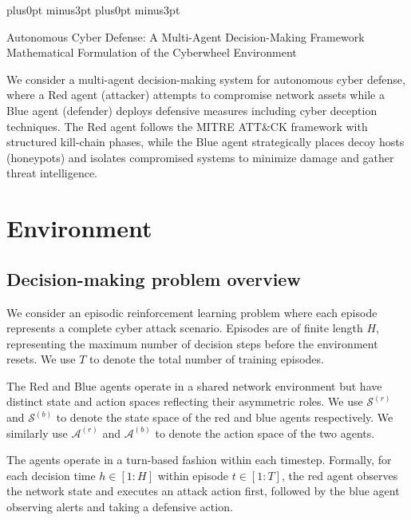 \documentclass[11pt]{article}
\newcounter{phase}[algorithm]
\theoremstyle{definition}
\theoremstyle{plain}
\newcommand{\MC}[1]{\mathcal{#1}}
\begin{document}
\abovedisplayskip=8pt plus0pt minus3pt
\belowdisplayskip=8pt plus0pt minus3pt

\begin{center}
 {\LARGE Autonomous Cyber Defense: A Multi-Agent Decision-Making Framework} \\ 
 \vspace{0.3cm}
 {\large Mathematical Formulation of the Cyberwheel Environment}
\end{center}

\tableofcontents

\clearpage

We consider a multi-agent decision-making system for autonomous cyber defense, where a Red agent (attacker) attempts to compromise network assets while a Blue agent (defender) deploys defensive measures including cyber deception techniques. The Red agent follows the MITRE ATT\&CK framework with structured kill-chain phases, while the Blue agent strategically places decoy hosts (honeypots) and isolates compromised systems to minimize damage and gather threat intelligence.

\section{Environment}

\subsection{Decision-making problem overview}
We consider an episodic reinforcement learning problem where each episode represents a complete cyber attack scenario. Episodes are of finite length $H$, representing the maximum number of decision steps before the environment resets. We use $T$ to denote the total number of training episodes.

The Red and Blue agents operate in a shared network environment but have distinct state and action spaces reflecting their asymmetric roles. We use $\MC{S}^{(r)}$ and $\MC{S}^{(b)}$ to denote the state space of the red and blue agents respectively. We similarly use $\MC{A}^{(r)}$ and $\MC{A}^{(b)}$ to denote the action space of the two agents.

The agents operate in a turn-based fashion within each timestep. Formally, for each decision time $h \in [1:H]$ within episode $t \in [1:T]$, the red agent observes the network state and executes an attack action first, followed by the blue agent observing alerts and taking a defensive action.
\end{document}
